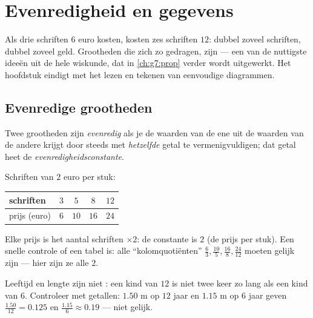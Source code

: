 \chapter{Evenredigheid en gegevens}\label{ch:g6:propdata}

Als drie schriften $6$ euro kosten, kosten zes schriften $12$: dubbel zoveel
schriften, dubbel zoveel geld. Grootheden die zich zo gedragen, zijn
\emph{} --- een van de nuttigste ideeën uit de hele wiskunde, dat in
\cref{ch:g7:prop} verder wordt uitgewerkt. Het hoofdstuk eindigt met het lezen
en tekenen van eenvoudige diagrammen.

\section{Evenredige grootheden}

\begin{definition}[Evenredigheid]\label{def:g6:propdata:def}
Twee grootheden zijn \emph{evenredig} als je de waarden van
de ene uit de waarden van de andere krijgt door steeds met \emph{hetzelfde} getal
te vermenigvuldigen; dat getal heet de \emph{evenredigheidsconstante}.
\end{definition}

\begin{example}\label{ex:g6:propdata:table}
Schriften van $2$ euro per stuk:
\begin{center}
\renewcommand{\arraystretch}{1.3}
\begin{tabular}{l|cccc}
schriften & $3$ & $5$ & $8$ & $12$ \\
\hline
prijs (euro) & $6$ & $10$ & $16$ & $24$ \\
\end{tabular}
\end{center}
Elke prijs is het aantal schriften $\times 2$: de constante is $2$ (de prijs per
stuk). Een snelle controle of een tabel  is: alle ``kolomquotiënten''
$\frac{6}{3}, \frac{10}{5}, \frac{16}{8}, \frac{24}{12}$ moeten gelijk zijn ---
hier zijn ze alle $2$.
\end{example}

\begin{example}\label{ex:g6:propdata:nonexample}
Leeftijd en lengte zijn niet : een kind van $12$ is niet twee keer zo
lang als een kind van $6$. Controleer met getallen: $1.50$ m op $12$ jaar en
$1.15$ m op $6$ jaar geven  $\frac{1.50}{12} = 0.125$ en
$\frac{1.15}{6} \approx 0.19$ --- niet gelijk.
\end{example}

